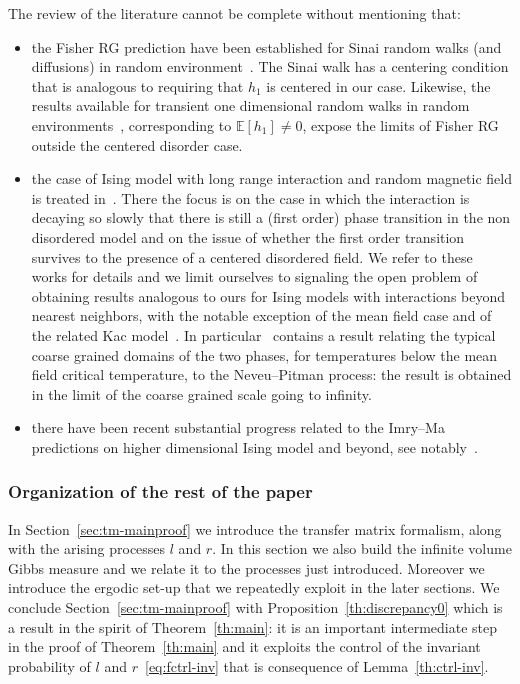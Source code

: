 \documentclass[10pt]{amsart}
\theoremstyle{definition}\newtheorem{defi}[theo]{Definition}\newtheorem{rema}[theo]{Remark}\newtheorem{exam}[theo]{Example}\newtheorem{exem}[theo]{Example}\newtheorem{nota}[theo]{Notation}
\newcommand{\bbE}{\mathbb{E}}
\begin{document}
The review of the literature cannot be complete without mentioning that:
\begin{itemize}
\item the Fisher RG prediction have been established for Sinai random walks (and diffusions) in random environment~\cite{cf:BF08,cf:Cheliotis}. The Sinai walk has a centering condition that is analogous to requiring that $h_1$ is centered in our case. Likewise, the results available for transient one dimensional random walks in random environments~\cite{cf:ESZ}, corresponding to $\bbE[h_1]\neq 0$, expose the limits of Fisher RG outside the centered disorder case.
\item the case of Ising model with long range interaction and random magnetic field is treated in~\cite{cf:AW,cf:COP1,cf:COP2,cf:DingHuandMaia}. There the focus is on the case in which the interaction is decaying so slowly that there is still a (first order) phase transition in the non disordered model and on the issue of whether the first order transition survives to the presence of a centered disordered field. We refer to these works for details and we limit ourselves to signaling the open problem of obtaining results analogous to ours for Ising models with interactions beyond nearest neighbors, with the notable exception of the mean field case and of the related Kac model~\cite{cf:COP0,cf:OP2009}. In particular~\cite{cf:OP2009} contains a result relating the typical coarse grained domains of the two phases, for temperatures below the mean field critical temperature, to the Neveu--Pitman process: the result is obtained in the limit of the coarse grained scale going to infinity.
\item there have been recent substantial progress related to the Imry--Ma predictions on higher dimensional Ising model and beyond, see notably~\cite{cf:AHP,cf:DingXia,cf:DingZhuang}.
\end{itemize}



\subsubsection{Organization of the rest of the paper}

In Section~\ref{sec:tm-mainproof} we introduce the transfer matrix formalism, along with the arising processes $l$ and $r$. In this section we also build the infinite volume Gibbs measure and we relate it to the processes just introduced. Moreover we introduce the ergodic set-up that we repeatedly exploit in the later sections. We conclude Section~\ref{sec:tm-mainproof} with Proposition~\ref{th:discrepancy0} which is a result in the spirit of Theorem~\ref{th:main}: it is an important intermediate step in the proof of Theorem~\ref{th:main} and it exploits the control of the invariant probability of $l$ and $r$~\eqref{eq:fctrl-inv} that is consequence of Lemma~\ref{th:ctrl-inv}.
\end{document}
